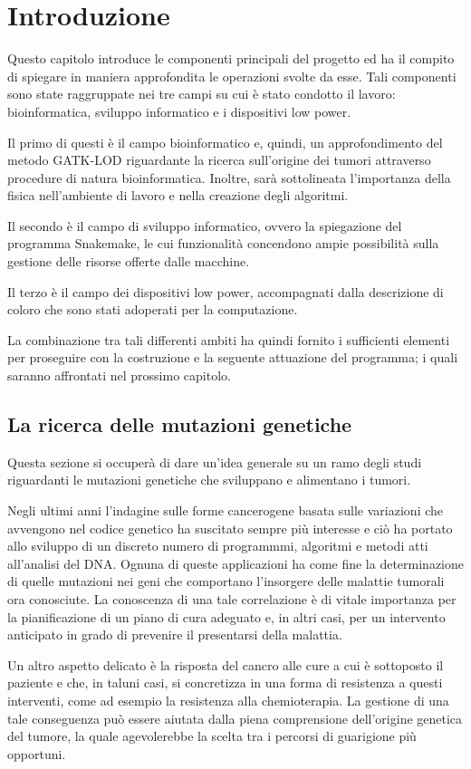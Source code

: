 \chapter{Introduzione}
Questo capitolo introduce le componenti principali del progetto ed ha il compito di spiegare in maniera approfondita le operazioni svolte da esse.
Tali componenti sono state raggruppate nei tre campi su cui è stato condotto il lavoro: bioinformatica, sviluppo informatico e i dispositivi low power.

Il primo di questi è il campo bioinformatico e, quindi, un approfondimento del metodo GATK-LOD riguardante la ricerca sull'origine dei tumori attraverso procedure di natura bioinformatica.
Inoltre, sarà sottolineata l'importanza della fisica nell'ambiente di lavoro e nella creazione degli algoritmi.

Il secondo è il campo di sviluppo informatico, ovvero la spiegazione del programma Snakemake, le cui funzionalità concendono ampie possibilità sulla gestione delle risorse offerte dalle macchine.

Il terzo è il campo dei dispositivi low power, accompagnati dalla descrizione di coloro che sono stati adoperati per la computazione.

La combinazione tra tali differenti ambiti ha quindi fornito i sufficienti elementi per proseguire con la costruzione e la seguente attuazione del programma; i quali saranno affrontati nel prossimo capitolo.


\section{La ricerca delle mutazioni genetiche}
Questa sezione si occuperà di dare un'idea generale su un ramo degli studi riguardanti le mutazioni genetiche che sviluppano e alimentano i tumori.

Negli ultimi anni l'indagine sulle forme cancerogene basata sulle variazioni che avvengono nel codice genetico ha suscitato sempre più interesse e ciò ha portato allo sviluppo di un discreto numero di programmmi, algoritmi e metodi atti all'analisi del DNA.
Ognuna di queste applicazioni ha come fine la determinazione di quelle mutazioni nei geni che comportano l'insorgere delle malattie tumorali ora conosciute.
La conoscenza di una tale correlazione è di vitale importanza per la pianificazione di un piano di cura adeguato e, in altri casi, per un intervento anticipato in grado di prevenire il presentarsi della malattia.

Un altro aspetto delicato è la risposta del cancro alle cure a cui è sottoposto il paziente e che, in taluni casi, si concretizza in una forma di resistenza a questi interventi, come ad esempio la resistenza alla chemioterapia.
La gestione di una tale conseguenza può essere aiutata dalla piena comprensione dell'origine genetica del tumore, la quale agevolerebbe la scelta tra i percorsi di guarigione più opportuni.

